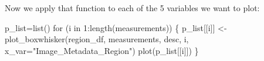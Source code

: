 \documentclass[
  12pt,
  letterpaper,
  DIV=11,
  numbers=noendperiod]{scrartcl}
\newenvironment{Shaded}{\begin{snugshade}}{\end{snugshade}}
\newcommand{\AttributeTok}[1]{\textcolor[rgb]{0.40,0.45,0.13}{#1}}
\newcommand{\ControlFlowTok}[1]{\textcolor[rgb]{0.00,0.23,0.31}{#1}}
\newcommand{\DecValTok}[1]{\textcolor[rgb]{0.68,0.00,0.00}{#1}}
\newcommand{\FunctionTok}[1]{\textcolor[rgb]{0.28,0.35,0.67}{#1}}
\newcommand{\NormalTok}[1]{\textcolor[rgb]{0.00,0.23,0.31}{#1}}
\newcommand{\OtherTok}[1]{\textcolor[rgb]{0.00,0.23,0.31}{#1}}
\newcommand{\SpecialCharTok}[1]{\textcolor[rgb]{0.37,0.37,0.37}{#1}}
\newcommand{\StringTok}[1]{\textcolor[rgb]{0.13,0.47,0.30}{#1}}
\begin{document}
Now we apply that function to each of the 5 variables we want to plot:

\begin{Shaded}
\begin{Highlighting}[]
\NormalTok{p\_list}\OtherTok{=}\FunctionTok{list}\NormalTok{()}
\ControlFlowTok{for}\NormalTok{ (i }\ControlFlowTok{in} \DecValTok{1}\SpecialCharTok{:}\FunctionTok{length}\NormalTok{(measurements)) \{}
\NormalTok{  p\_list[[i]] }\OtherTok{\textless{}{-}} \FunctionTok{plot\_boxwhisker}\NormalTok{(region\_df, measurements, desc, i, }\AttributeTok{x\_var=}\StringTok{"Image\_Metadata\_Region"}\NormalTok{)}
  \FunctionTok{plot}\NormalTok{(p\_list[[i]])}
\NormalTok{\}}
\end{Highlighting}
\end{Shaded}

\begin{figure}

\begin{minipage}[t]{0.33\linewidth}

{\centering 


}

\subcaption{\label{fig-expgroup_region-1}}
\end{minipage}%
%
\begin{minipage}[t]{0.33\linewidth}

{\centering 

\raisebox{-\height}{

}}
\end{minipage}
\end{figure}
\end{document}
